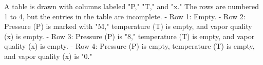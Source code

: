 A table is drawn with columns labeled "P," "T," and "x." The rows are numbered 1 to 4, but the entries in the table are incomplete.  
- Row 1: Empty.  
- Row 2: Pressure (P) is marked with "M," temperature (T) is empty, and vapor quality (x) is empty.  
- Row 3: Pressure (P) is "8," temperature (T) is empty, and vapor quality (x) is empty.  
- Row 4: Pressure (P) is empty, temperature (T) is empty, and vapor quality (x) is "0."